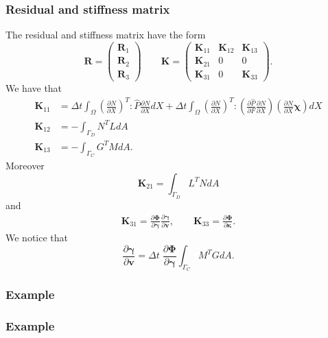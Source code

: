 \documentclass[8pt]{beamer}
\numberwithin{equation}{section}
\theoremstyle{definition}
\newcommand{\dind}[2]{\frac{\partial #1}{\partial #2}}
\begin{document}
\begin{frame}
\frametitle{Residual and stiffness matrix}
The residual and stiffness matrix have the form
\[
\boldsymbol{R}=
\begin{pmatrix}
\boldsymbol{R}_1 \\
\boldsymbol{R}_2 \\
\boldsymbol{R}_3
\end{pmatrix}
\qquad
\boldsymbol{K}=
\begin{pmatrix}
\boldsymbol{K}_{11} & \boldsymbol{K}_{12} & \boldsymbol{K}_{13} \\
\boldsymbol{K}_{21} & 0 & 0 \\
\boldsymbol{K}_{31} & 0 & \boldsymbol{K}_{33}
\end{pmatrix}.
\]
We have that
\begin{align*}
\boldsymbol{K}_{11}&=\Delta t\int_\Omega\left(\dind{N}{X}\right)^T:\hat{P}\dind{N}{X}dX+\Delta t\int_\Omega\left(\dind{N}{X}\right)^T:\left(\dind{\hat{P}}{F}\dind{N}{X}\right)\left(\dind{N}{X}\boldsymbol\chi\right)dX \\
\boldsymbol{K}_{12}&=-\int_{\Gamma_D}N^TLdA \\
\boldsymbol{K}_{13}&=-\int_{\Gamma_C}G^TMdA.
\end{align*}
Moreover
\[
\boldsymbol{K}_{21}=\int_{\Gamma_D}L^TNdA
\]
and
\begin{gather*}
\boldsymbol{K}_{31}=\dind{\boldsymbol{\Phi}}{\boldsymbol{\gamma}}\dind{\boldsymbol{\gamma}}{\boldsymbol{v}},\qquad\boldsymbol{K}_{33}=\dind{\boldsymbol{\Phi}}{\boldsymbol{\kappa}}.
\end{gather*}
We notice that
\[
\dind{\boldsymbol{\gamma}}{\boldsymbol{v}}=\Delta t\;\dind{\boldsymbol{\Phi}}{\boldsymbol{\gamma}}\int_{\Gamma_C}M^TGdA.
\]
\end{frame}

\begin{frame}
\frametitle{Example}
\begin{figure}[p]
\end{figure}
\end{frame}

\begin{frame}
\frametitle{Example}

\begin{figure}[p]
\end{figure}
\end{frame}
\end{document}
